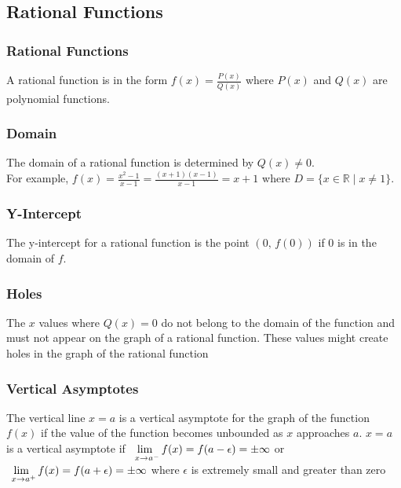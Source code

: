 \documentclass{article}
\begin{document}
	\subsection{Rational Functions}
	\subsubsection{Rational Functions}
	A rational function is in the form $f(x)=\frac{P(x)}{Q(x)}$ where $P(x)$ and $Q(x)$ are polynomial functions.
	\subsubsection{Domain}
	The domain of a rational function is determined by $Q(x)\neq0$.\\
	For example, $f(x)=\frac{x^2-1}{x-1}=\frac{(x+1)(x-1)}{x-1}=x+1$ where $D=\{x\in\mathbb{R}\mid x\neq1\}$.\\
	\subsubsection{Y-Intercept}
	The y-intercept for a rational function is the point $(0,\,f(0))$ if 0 is in the domain of $f$.
	\subsubsection{Holes}
	The $x$ values where $Q(x)=0$ do not belong to the domain of the function and must not appear on the graph of a rational function. These values might create holes in the graph of the rational function
	\subsubsection{Vertical Asymptotes}
	The vertical line $x=a$ is a vertical asymptote for the graph of the function $f(x)$ if the value of the function becomes unbounded as $x$ approaches $a$. $x=a$ is a vertical asymptote if $\lim\limits_{\hspace{1ex}x\to a^-}f(x)=f(a-\epsilon)=\pm\infty$ or $\lim\limits_{\hspace{1ex}x\to a^+}f(x)=f(a+\epsilon)=\pm\infty$ where $\epsilon$ is extremely small and greater than zero
\end{document}
